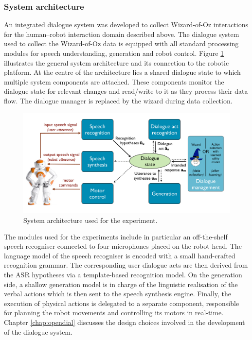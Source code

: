 \subsubsection*{System architecture}

An integrated dialogue system was developed to collect Wizard-of-Oz interactions for the human--robot interaction domain described above. The dialogue system used to collect the Wizard-of-Oz data is equipped with all standard processing modules for speech understanding, generation and robot control.  Figure \ref{fig:exp1_architecture} illustrates the general system architecture and its connection to the robotic platform. At the centre of the architecture lies a shared dialogue state to which multiple system components are attached. These components monitor the dialogue state for relevant changes and read/write to it as they process their data flow. The dialogue manager is replaced by the wizard during data collection. 

\begin{figure}[ht]
\begin{center}
\includegraphics[scale=0.30]{imgs/exp1_architecture.pdf}
\end{center}
\caption{System architecture used for the experiment.}
\label{fig:exp1_architecture}
\end{figure}

The modules used for the experiments include in particular an off-the-shelf speech recogniser connected to four microphones placed on the robot head. The language model of the speech recogniser is encoded with a small hand-crafted recognition grammar. The corresponding user dialogue acts are then derived from the ASR hypotheses via a template-based recognition model. On the generation side, a shallow generation model is in charge of the linguistic realisation of the verbal actions which is then sent to the speech synthesis engine.  Finally, the execution of physical actions is delegated to a separate component, responsible for planning the robot movements and controlling its motors in real-time.  Chapter \ref{chap:opendial} discusses the design choices involved in the development of the dialogue system.

